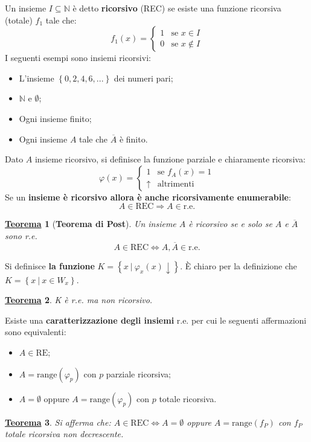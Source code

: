 \documentclass[a4paper]{article}
\newtheorem{theorem}{\textcolor{Red3}{\underline{Teorema}}}
\begin{document}
	\noindent
	Un insieme $I \subseteq \mathbb{N}$ è detto \textcolor{Red3}{\textbf{ricorsivo}} (REC) se esiste una funzione ricorsiva (totale) $f_{1}$ tale che:
	\begin{equation*}
		f_{1}\left(x\right) = \begin{cases}
			1 & \text{se } x \in I \\
			0 & \text{se } x \notin I
		\end{cases}
	\end{equation*}
	I seguenti esempi sono insiemi ricorsivi:
	\begin{itemize}
		\item L'insieme $\left\{0,2,4,6,...\right\}$ dei numeri pari;
		\item $\mathbb{N}$ e $\emptyset$;
		\item Ogni insieme finito;
		\item Ogni insieme $A$ tale che $\overline{A}$ è finito.
	\end{itemize}
	Dato $A$ insieme ricorsivo, si definisce la funzione parziale e chiaramente ricorsiva:
	\begin{equation*}
		\varphi\left(x\right) = \begin{cases}
			1 & \text{se } f_{A}\left(x\right) = 1 \\
			\uparrow & \text{altrimenti}
		\end{cases}
	\end{equation*}
	Se un \textbf{insieme è ricorsivo allora è anche ricorsivamente enumerabile}:
	\begin{equation*}
		A \in \mathrm{REC} \Longrightarrow A \in \mathrm{r.e.}
	\end{equation*}
	\begin{theorem}[\textbf{Teorema di Post}]
		Un insieme $A$ è ricorsivo se e solo se $A$ e $\overline{A}$ sono r.e.
		\begin{equation*}
			A \in \mathrm{REC} \iff A, \overline{A} \in \mathrm{r.e.}
		\end{equation*}
	\end{theorem}
	\noindent
	Si definisce \textbf{la funzione} $K = \left\{x \: | \: \varphi_{x}\left(x\right) \downarrow\right\}$. È chiaro per la definizione che $K = \left\{x \: | \: x \in W_{x}\right\}$.
	\begin{theorem}
		K è r.e. ma non ricorsivo.
	\end{theorem}

	\noindent
	Esiste una \textcolor{Red3}{\textbf{caratterizzazione degli insiemi}} r.e. per cui le seguenti affermazioni sono equivalenti:
	\begin{itemize}
		\item $A \in \mathrm{RE}$;
		\item $A = \mathrm{range}\left(\varphi_{p}\right)$ con $p$ parziale ricorsiva;
		\item $A = \emptyset$ oppure $A = \mathrm{range}\left(\varphi_{p}\right)$ con $p$ totale ricorsiva.
	\end{itemize}
	\begin{theorem}
		Si afferma che: $A \in \mathrm{REC} \iff A=\emptyset$ oppure $A = \mathrm{range}\left(f_{P}\right)$ con $f_{P}$ totale ricorsiva non decrescente.
	\end{theorem}
\end{document}
